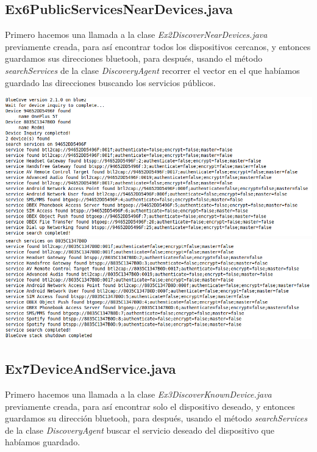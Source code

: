 \documentclass{article}
\begin{document}
\subsection{Ex6PublicServicesNearDevices.java}

Primero hacemos una llamada a la clase \textit{Ex2DiscoverNearDevices.java} previamente creada, para así encontrar todos los dispositivos cercanos, y entonces guardamos sus direcciones bluetooh, para después, usando el método \textit{searchServices} de la clase \textit{DiscoveryAgent} recorrer el vector en el que habíamos guardado las direcciones buscando los servicios públicos.

\begin{flushleft}
	\includegraphics[scale=0.5]{imagenes/Ex6PublicServicesNearDevices_1.png} 
	\includegraphics[scale=0.5]{imagenes/Ex6PublicServicesNearDevices_2.png} 
\end{flushleft}

\subsection{Ex7DeviceAndService.java}

Primero hacemos una llamada a la clase \textit{Ex3DiscoverKnownDevice.java} previamente creada, para así encontrar solo el dispositivo deseado, y entonces guardamos su dirección bluetooh, para después, usando el método \textit{searchServices} de la clase \textit{DiscoveryAgent} buscar el servicio deseado del dispositivo que habíamos guardado.
\end{document}
